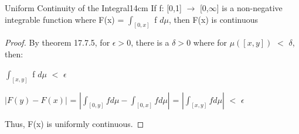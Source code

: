     \vspace{0.5cm}



    \begin{corollary}{Uniform Continuity of the Integral}{14cm}
        If f: [0,1] $\rightarrow$ [0,$\infty$] is a non-negative integrable
        function where F(x) = $\int_{[0,x]}$ f $d\mu$, then F(x) is continuous
    \end{corollary}

    \begin{proof}
        By {\color{red} theorem 17.7.5}, for $\epsilon > 0$,
        there is a $\delta > 0$ where for $\mu([x,y])$ $<$ $\delta$, then:

        \hspace{0.5cm}
        $\int_{[x,y]}$ f $d\mu$ $<$ $\epsilon$

        \hspace{0.5cm}
        $|F(y) - F(x)|$
        = $|\int_{[0,y]} f d\mu - \int_{[0,x]} f d\mu|$
        = $|\int_{[x,y]} f d\mu|$
        $<$ $\epsilon$

        Thus, F(x) is uniformly continuous.
    \end{proof}



























